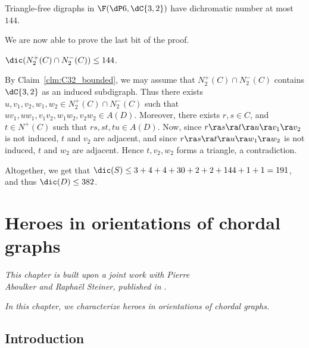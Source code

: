 \begin{claim}\label{clm:C32_bounded}
Triangle-free digraphs in $\F(\dP6, \dC{3,2})$ have dichromatic number at most $144$. 
\end{claim}

We are now able to prove the last bit of the proof. 

\begin{claim}\label{clm:N2+capN2-}
$\dic(N^{+}_2(C) \cap N^{-}_2(C)) \leq 144$.
\end{claim}

\begin{subproof}
By Claim~\ref{clm:C32_bounded}, we may assume that $N^{+}_2(C) \cap N^{-}_2(C)$ contains  $\dC{3,2}$ as an induced subdigraph. 
Thus there exists $u,v_1,v_2,w_1,w_2 \in N^{+}_2(C) \cap N^{-}_2(C)$ such that $uv_1, uw_1, v_1v_2, w_1w_2, v_2w_2 \in A(D)$. 
Moreover, there exists $r,s \in C$, and $t \in N^+(C)$ such that $rs,st,tu \in A(D)$. Now, since $r \ra s \ra t \ra u \ra v_1 \ra v_2$ is not induced, $t$ and $v_2$ are adjacent, and since $r \ra s \ra t \ra u \ra w_1 \ra w_2$ is not induced, $t$ and $w_2$ are adjacent. Hence $t,v_2,w_2$ forms a triangle, a contradiction. 
\end{subproof}


Altogether, we get that $\dic(S) \leq 3 + 4 + 4 + 30 +2 + 2 + 144 +1 +1 = 191$, and thus $\dic(D) \leq 382$. 

\chapter{Heroes in orientations of chordal graphs}\label{chpt:chordal}

\begin{flushright}{\slshape    
This chapter is built upon a joint work with Pierre \\
Aboulker and Rapha\"el Steiner, published in \cite{AAS22}}. \\ \medskip
\end{flushright}

\emph{In this chapter, we characterize heroes in orientations of chordal graphs.}


\section{Introduction}


